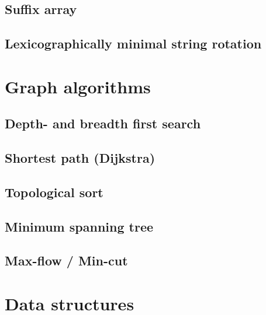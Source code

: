 \documentclass[a4paper,10pt]{article}
\begin{document}
\subsection{Suffix array}

\subsection{Lexicographically minimal string rotation}

\newpage
\section{Graph algorithms}
\subsection{Depth- and breadth first search}

\subsection{Shortest path (Dijkstra)}

\subsection{Topological sort}
\subsection{Minimum spanning tree}
\subsection{Max-flow / Min-cut}


%
%
\newpage
\section{Data structures}
\end{document}
